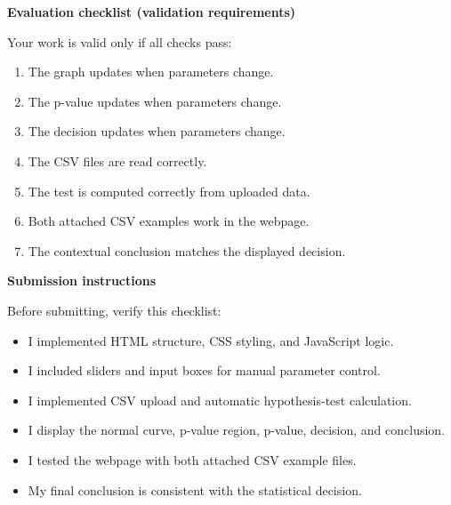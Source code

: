 \documentclass[12pt]{article}
\newcommand{\SubsectionBox}[1]{%
\noindent\colorbox{gray!30}{%
\parbox{\linewidth}{\textbf{#1}}%
}\par\vspace{0.35cm}%
}
\begin{document}
\SubsectionBox{Evaluation checklist (validation requirements)}
Your work is valid only if all checks pass:
\begin{enumerate}
\item The graph updates when parameters change.
\item The p-value updates when parameters change.
\item The decision updates when parameters change.
\item The CSV files are read correctly.
\item The test is computed correctly from uploaded data.
\item Both attached CSV examples work in the webpage.
\item The contextual conclusion matches the displayed decision.
\end{enumerate}

\SubsectionBox{Submission instructions}
Before submitting, verify this checklist:
\begin{itemize}
\item[$\square$] I implemented HTML structure, CSS styling, and JavaScript logic.
\item[$\square$] I included sliders and input boxes for manual parameter control.
\item[$\square$] I implemented CSV upload and automatic hypothesis-test calculation.
\item[$\square$] I display the normal curve, p-value region, p-value, decision, and conclusion.
\item[$\square$] I tested the webpage with both attached CSV example files.
\item[$\square$] My final conclusion is consistent with the statistical decision.
\end{itemize}
\end{document}
